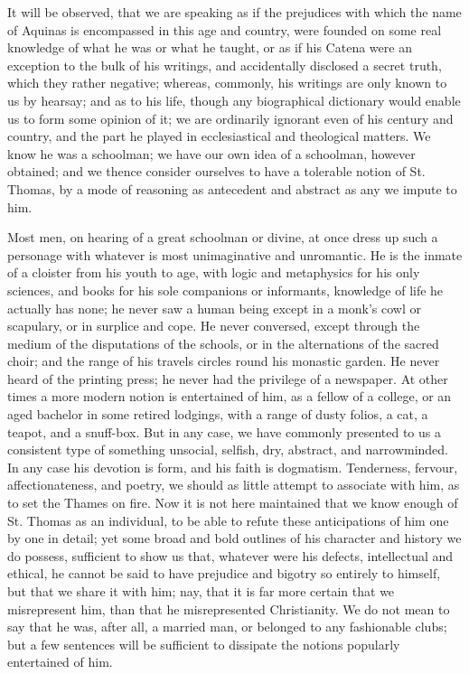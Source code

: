 It will be observed, that we are speaking as if the
prejudices with which the name of Aquinas is encompassed in this age and
country, were founded on some real knowledge of what he was or what he
taught, or as if his Catena were an exception to the bulk of his
writings, and accidentally disclosed a secret truth, which they rather
negative; whereas, commonly, his writings are only known to us by
hearsay; and as to his life, though any biographical dictionary would
enable us to form some opinion of it; we are ordinarily ignorant even of
his century and country, and the part he played in ecclesiastical and
theological matters. We know he was a schoolman; we have our own idea of
a schoolman, however obtained; and we thence consider ourselves to have
a tolerable notion of St. Thomas, by a mode of reasoning as antecedent
and abstract as any we impute to him.

Most men, on hearing of a great schoolman or
divine, at once dress up such a personage with whatever is most
unimaginative and unromantic. He is the inmate of a cloister from his
youth to age, with logic and metaphysics for his only sciences, and
books for his sole companions or informants, knowledge of life he
actually has none; he never saw a human being except in a monk's cowl or
scapulary, or in surplice and cope. He never conversed, except through
the medium of the disputations of the schools, or in the alternations of
the sacred choir; and the range of his travels circles round his
monastic garden. He never heard of the printing press; he never had the
privilege of a newspaper. At other times a more modern notion is
entertained of him, as a fellow of a college, or an aged bachelor in
some retired lodgings, with a range of dusty folios, a cat, a teapot,
and a snuff-box. But in any case, we have commonly presented to us a
consistent type of something unsocial, selfish, dry, abstract, and
narrowminded. In any case his devotion is form, and his faith is
dogmatism. Tenderness, fervour, affectionateness, and poetry, we should
as little attempt to associate with him, as to set the Thames on fire.
Now it is not here maintained that we know enough of St. Thomas as an
individual, to be able to refute these anticipations of him one by one
in detail; yet some broad and bold outlines of his character and history
we do possess, sufficient to show us that, whatever were his defects,
intellectual and ethical, he cannot be said to have prejudice and
bigotry so entirely to himself, but that we share it with him; nay, that
it is far more certain that we misrepresent him, than that he
misrepresented Christianity. We do not mean to say that he was, after
all, a married man, or belonged to any fashionable clubs; but a few
sentences will be sufficient to dissipate the notions popularly
entertained of him.


